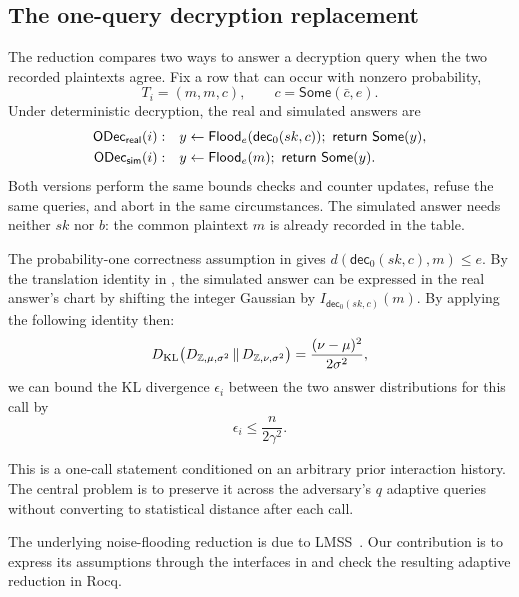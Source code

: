 \subsection{The one-query decryption replacement}
\label{sec:simulation-target}

The reduction compares two ways to answer a decryption query when the two
recorded plaintexts agree.
Fix a row that can occur with nonzero probability,
\[
 T_i=(m,m,c),
 \qquad c=\mathsf{Some}(\bar c,e).
\]
Under deterministic decryption, the real and simulated answers are
\begin{align}
\label{eq:real-sim-decrypt}
 \mathsf{ODec}_{\mathsf{real}}(i):\quad&
   y\leftarrow\mathsf{Flood}_e(\mathsf{dec}_0(sk,c));
   \ \mathsf{return}\ \mathsf{Some}(y),\notag\\
 \mathsf{ODec}_{\mathsf{sim}}(i):\quad&
   y\leftarrow\mathsf{Flood}_e(m);
   \ \mathsf{return}\ \mathsf{Some}(y).
\end{align}
Both versions perform the same bounds checks and counter updates, refuse the
same queries, and abort in the same circumstances.
The simulated answer needs neither \(sk\) nor \(b\): the common plaintext
\(m\) is already recorded in the table.

The probability-one correctness assumption in 
gives
\(d(\mathsf{dec}_0(sk,c),m)\leq e\).
By the translation identity in , the simulated answer can
be expressed in the real answer's chart by shifting the integer Gaussian by
\(I_{\mathsf{dec}_0(sk,c)}(m)\).
By applying the following identity then:
\begin{equation}
\label{eq:dg-kl}
 D_{\mathrm{KL}}\!\left(D_{\mathbb{Z},\mu,\sigma^2}\,\|\,D_{\mathbb{Z},\nu,\sigma^2}\right)
   =\frac{(\nu-\mu)^2}{2\sigma^2},
\end{equation}
we can bound the KL divergence \(\epsilon_i\) between the two answer
distributions for this call by
\begin{equation}
\label{eq:epsilon-nf}
 \epsilon_i
 \leq\frac{n}{2\gamma^2}.
\end{equation}

This is a one-call statement conditioned on an arbitrary prior interaction
history.
The central problem is to preserve it across the adversary's \(q\) adaptive
queries without converting to statistical distance after each call.

The underlying noise-flooding reduction is due to LMSS~\cite{lmss}.
Our contribution is to express its assumptions through the interfaces in
 and check the resulting adaptive reduction in Rocq.

